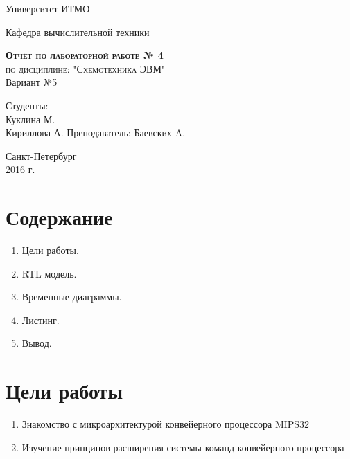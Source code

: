\documentclass[a4paper, 10pt]{article}
\begin{document}
    \begin{titlepage}
        \begin{center}
            \large
            Университет ИТМО
            \vspace{3cm}


            Кафедра вычислительной техники
            \vspace{4cm}

            \textsc{ \textbf{Отчёт по лабораторной работе  № 4} \\
            по дисциплине: "Схемотехника ЭВМ"}\\Вариант №5\\[8mm]

            \bigskip
        \end{center}
        \vspace{3cm}

        \hfill\begin{flushright}
             Студенты: \\
             Куклина М.\\
             Кириллова А.
             \vfill
             Преподаватель:
             Баевских A.
        \end{flushright}
        \vfill
        \vfill
        \vfill
        \vfill
        \vfill
        \begin{center}
            Санкт-Петербург \\2016 г.
        \end{center}
    \end{titlepage}
   \newpage
    \section*{Содержание}
        \begin{enumerate}
            \item Цели работы.
            \item RTL модель.
            \item Временные диаграммы.
            \item Листинг.
            \item Вывод.
        \end{enumerate}

    \section*{Цели работы}
        \begin{enumerate}
            \item  Знакомство с микроархитектурой конвейерного процессора MIPS32 
            \item   Изучение принципов расширения системы команд конвейерного процессора 
        \end{enumerate}
\end{document}
